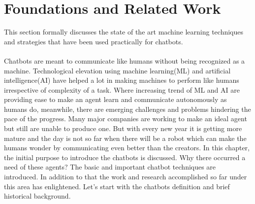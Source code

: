 \chapter{Foundations and Related Work\label{cha:chapter2}}
This section formally discusses the state of the art machine learning techniques and strategies that have been used practically for chatbots.
\\~\\
Chatbots are meant to communicate like humans without being recognized as a machine. Technological elevation using machine learning(ML) and artificial intelligence(AI) have helped a lot in making machines to perform like humans irrespective of complexity of a task. Where increasing trend of ML and AI are providing ease to make an agent learn and communicate autonomously as humans do, meanwhile, there are emerging challenges and problems hindering the pace of the progress. Many major companies are working to make an ideal agent but still are unable to produce one. But with every new year it is getting more mature and the day is not so far when there will be a robot which can make the humans wonder by communicating even better than the creators. In this chapter, the initial purpose to introduce the chatbots is discussed. Why there occurred a need of these agents? The basic and important chatbot techniques are introduced. In addition to that the work and research accomplished so far under this area has enlightened. Let's start with the chatbots definition and brief historical background.     

